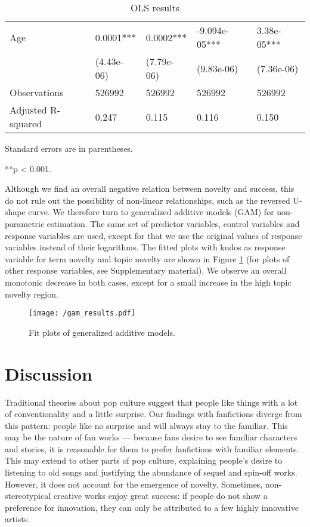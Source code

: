 \documentclass[a4paper]{article}
\begin{document}
\begin{table}
\begin{tabular}[width=0.8\textwidth]{p{4cm}p{3cm}p{3cm}p{3cm}p{3cm}}
Age & 0.0001***& 0.0002*** & -9.094e-05***& 3.38e-05***\\
& (4.43e-06) & (7.79e-06) & (9.83e-06) & (7.36e-06)\\
\hline 
Observations & 526992 & 526992 & 526992 & 526992 \\
Adjusted R-squared & 0.247 & 0.115 & 0.116  & 0.150\\
\bottomrule
\end{tabular}
 \begin{tablenotes}
      \small
      \item Standard errors are in parentheses.
      \item ***p < 0.001.
       \end{tablenotes}
\caption{OLS results}
\label{tab:regression}
\end{table}%

Although we find an overall negative relation between novelty and success, this do not rule out the possibility of non-linear relationships, such as the reversed U-shape curve. We therefore turn to generalized additive models (GAM) \cite{wood2006generalized} for non-parametric estimation. The same set of predictor variables, control variables and response variables are used, except for that we use the original values of response variables instead of their logarithms. The fitted plots with kudos as response variable for term novelty and topic novelty are shown in Figure \ref{fig:gam} (for plots of other response variables, see Supplementary material). We observe an overall monotonic decrease in both cases, except for a small increase in the high topic novelty region.

\begin{figure}
    \centering
          \texttt{[image: /gam\_results.pdf]}
        \caption{Fit plots of generalized additive models.}
        \label{fig:gam}
\end{figure}

\section*{Discussion}
Traditional theories about pop culture suggest that people like things with a lot of conventionality and a little surprise. Our findings with fanfictions diverge from this pattern: people like no surprise and will always stay to the familiar. This may be the nature of fan works --- because fans desire to see familiar characters and stories, it is reasonable for them to prefer fanfictions with familiar elements. This may extend to other parts of pop culture, explaining people's desire to listening to old songs and justifying the abundance of sequel and spin-off works. However, it does not account for the emergence of novelty. Sometimes, non-stereotypical creative works enjoy great success: if people do not show a preference for innovation, they can only be attributed to a few highly innovative artists.
\end{document}
